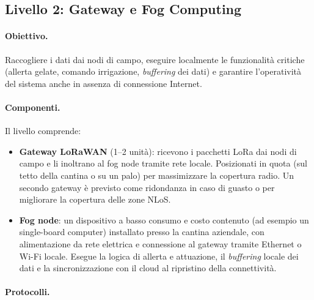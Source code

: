 \subsection{Livello 2: Gateway e Fog Computing}

\paragraph{Obiettivo.} Raccogliere i dati dai nodi di campo, eseguire localmente le funzionalità critiche (allerta gelate, comando irrigazione, \textit{buffering} dei dati) e garantire l'operatività del sistema anche in assenza di connessione Internet.

\paragraph{Componenti.} Il livello comprende:

\begin{itemize}
	\item \textbf{Gateway LoRaWAN} (1--2 unità): ricevono i pacchetti LoRa dai nodi di campo e li inoltrano al fog node tramite rete locale. Posizionati in quota (sul tetto della cantina o su un palo) per massimizzare la copertura radio. Un secondo gateway è previsto come ridondanza in caso di guasto o per migliorare la copertura delle zone NLoS.

	\item \textbf{Fog node}: un dispositivo a basso consumo e costo contenuto (ad esempio un single-board computer) installato presso la cantina aziendale, con alimentazione da rete elettrica e connessione al gateway tramite Ethernet o Wi-Fi locale. Esegue la logica di allerta e attuazione, il \textit{buffering} locale dei dati e la sincronizzazione con il cloud al ripristino della connettività.
\end{itemize}

\paragraph{Protocolli.}


